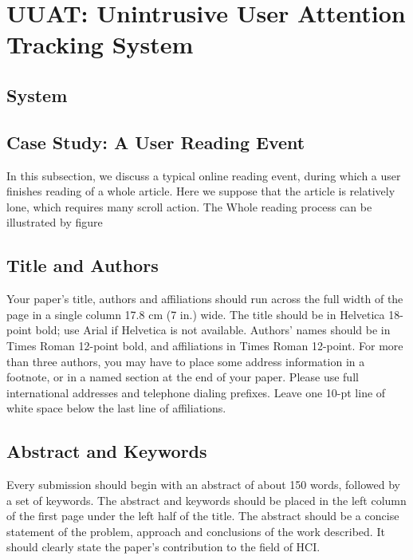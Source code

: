 \documentclass{sigchi}
\begin{document}
\section {UUAT: Unintrusive User Attention Tracking System}

\subsection{System }

\subsection{Case Study: A User Reading Event}
In this subsection, we discuss a typical online reading event, during which a user finishes reading of a whole article. Here we suppose 
that the article is relatively lone, which requires many scroll action. The Whole reading process can be illustrated by figure 












\subsection{Title and Authors}

Your paper's title, authors and affiliations should run across the
full width of the page in a single column 17.8 cm (7 in.) wide.  The
title should be in Helvetica 18-point bold; use Arial if Helvetica is
not available.  Authors' names should be in Times Roman 12-point bold,
and affiliations in Times Roman 12-point.  For more than three authors,
you may have to place some address information in a footnote, or in a named
section at the end of your paper. Please use full international addresses and
telephone dialing prefixes.  Leave one 10-pt line of white space below the last
line of affiliations.

\subsection{Abstract and Keywords}

Every submission should begin with an abstract of about 150 words,
followed by a set of keywords. The abstract and keywords should be
placed in the left column of the first page under the left half of the
title. The abstract should be a concise statement of the problem,
approach and conclusions of the work described.  It should clearly
state the paper's contribution to the field of HCI.
\end{document}
